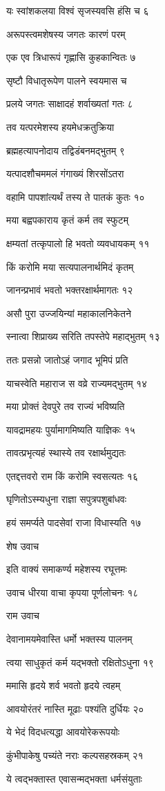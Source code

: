 यः स्वांशकलया विश्वं सृजस्यवसि हंसि च ६

अरूपस्त्वमशेषस्य जगतः कारणं परम्

एक एव त्रिधारूपं गृह्णासि कुहकान्वितः ७

सृष्टौ विधातृरूपेण पालने स्वयमास च

प्रलये जगतः साक्षादहं शर्वाख्यतां गतः ८

तव यत्परमेशस्य हयमेधक्रतुक्रिया

ब्रह्महत्यापनोदाय तद्विडंबनमद्भुतम् ९

यत्पादशौचममलं गंगाख्यं शिरसोंऽतरा

वहामि पापशांत्यर्थं तस्य ते पातकं कुतः १०

मया बह्वपकाराय कृतं कर्म तव स्फुटम्

क्षम्यतां तत्कृपालो हि भवतो व्यवधायकम् ११

किं करोमि मया सत्यपालनार्थमिदं कृतम्

जानन्प्रभावं भवतो भक्तरक्षार्थमागतः १२

असौ पुरा उज्जयिन्यां महाकालनिकेतने

स्नात्वा शिप्राख्य सरिति तपस्तेपे महाद्भुतम् १३

ततः प्रसन्नो जातोऽहं जगाद भूमिपं प्रति

याचस्वेति महाराज स वव्रे राज्यमद्भुतम् १४

मया प्रोक्तं देवपुरे तव राज्यं भविष्यति

यावद्रामहयः पुर्यामागमिष्यति याज्ञिकः १५

तावत्प्रभृत्यहं स्थास्ये तव रक्षार्थमुद्यतः

एतद्दत्तवरो राम किं करोमि स्वसत्यतः १६

घृणितोऽस्म्यधुना राज्ञा सपुत्रपशुबांधवः

हयं समर्प्यते पादसेवां राजा विधास्यति १७

शेष उवाच

इति वाक्यं समाकर्ण्य महेशस्य रघूत्तमः

उवाच धीरया वाचा कृपया पूर्णलोचनः १८

राम उवाच

देवानामयमेवास्ति धर्मो भक्तस्य पालनम्

त्वया साधुकृतं कर्म यद्भक्तो रक्षितोऽधुना १९

ममासि हृदये शर्व भवतो हृदये त्वहम्

आवयोरंतरं नास्ति मूढाः पश्यंति दुर्धियः २०

ये भेदं विदधत्यद्धा आवयोरेकरूपयोः

कुंभीपाकेषु पच्यंते नराः कल्पसहस्रकम् २१

ये त्वद्भक्तास्त एवासन्मद्भक्ता धर्मसंयुताः

